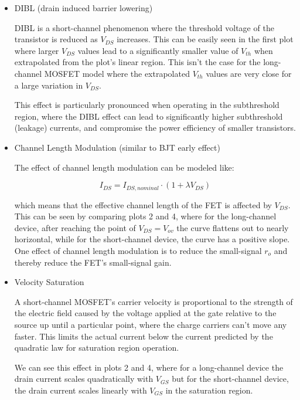 \documentclass[11pt]{article}
\begin{document}
\begin{itemize}
	\item DIBL (drain induced barrier lowering)
	
	DIBL is a short-channel phenomenon where the threshold voltage of the transistor is reduced as $V_{DS}$ increases. This can be easily seen in the first plot where larger $V_{DS}$ values lead to a significantly smaller value of $V_{th}$ when extrapolated from the plot's linear region. This isn't the case for the long-channel MOSFET model where the extrapolated $V_{th}$ values are very close for a large variation in $V_{DS}$.
	
	This effect is particularly pronounced when operating in the subthreshold region, where the DIBL effect can lead to significantly higher subthreshold (leakage) currents, and compromise the power efficiency of smaller transistors.

	\item Channel Length Modulation (similar to BJT early effect)
	
	The effect of channel length modulation can be modeled like:
	
	\begin{equation*}
		I_{DS} = I_{DS, nominal} \cdot (1 + \lambda V_{DS}) 
	\end{equation*} 
	
	which means that the effective channel length of the FET is affected by $V_{DS}$. This can be seen by comparing plots 2 and 4, where for the long-channel device, after reaching the point of $V_{DS} = V_{ov}$ the curve flattens out to nearly horizontal, while for the short-channel device, the curve has a positive slope. One effect of channel length modulation is to reduce the small-signal $r_o$ and thereby reduce the FET's small-signal gain.
	
	\item Velocity Saturation
	
	A short-channel MOSFET's carrier velocity is proportional to the strength of the electric field caused by the voltage applied at the gate relative to the source up until a particular point, where the charge carriers can't move any faster. This limits the actual current below the current predicted by the quadratic law for saturation region operation.
	
	We can see this effect in plots 2 and 4, where for a long-channel device the drain current scales quadratically with $V_{GS}$ but for the short-channel device, the drain current scales linearly with $V_{GS}$ in the saturation region.
\end{itemize}
\end{document}
